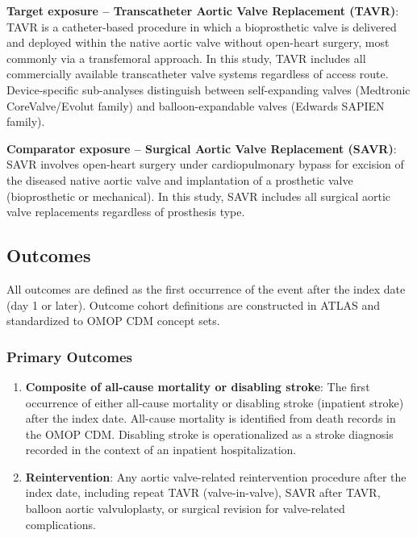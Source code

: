 \documentclass[
  12pt,
]{article}
\begin{document}
\textbf{Target exposure -- Transcatheter Aortic Valve Replacement
(TAVR)}: TAVR is a catheter-based procedure in which a bioprosthetic
valve is delivered and deployed within the native aortic valve without
open-heart surgery, most commonly via a transfemoral approach. In this
study, TAVR includes all commercially available transcatheter valve
systems regardless of access route. Device-specific sub-analyses
distinguish between self-expanding valves (Medtronic CoreValve/Evolut
family) and balloon-expandable valves (Edwards SAPIEN family).

\textbf{Comparator exposure -- Surgical Aortic Valve Replacement
(SAVR)}: SAVR involves open-heart surgery under cardiopulmonary bypass
for excision of the diseased native aortic valve and implantation of a
prosthetic valve (bioprosthetic or mechanical). In this study, SAVR
includes all surgical aortic valve replacements regardless of prosthesis
type.

\subsection{Outcomes}\label{outcomes}

All outcomes are defined as the first occurrence of the event after the
index date (day 1 or later). Outcome cohort definitions are constructed
in ATLAS and standardized to OMOP CDM concept sets.

\subsubsection{Primary Outcomes}\label{primary-outcomes}

\begin{enumerate}
\def\labelenumi{\arabic{enumi}.}
\item
  \textbf{Composite of all-cause mortality or disabling stroke}: The
  first occurrence of either all-cause mortality or disabling stroke
  (inpatient stroke) after the index date. All-cause mortality is
  identified from death records in the OMOP CDM. Disabling stroke is
  operationalized as a stroke diagnosis recorded in the context of an
  inpatient hospitalization.
\item
  \textbf{Reintervention}: Any aortic valve-related reintervention
  procedure after the index date, including repeat TAVR
  (valve-in-valve), SAVR after TAVR, balloon aortic valvuloplasty, or
  surgical revision for valve-related complications.
\end{enumerate}
\end{document}
